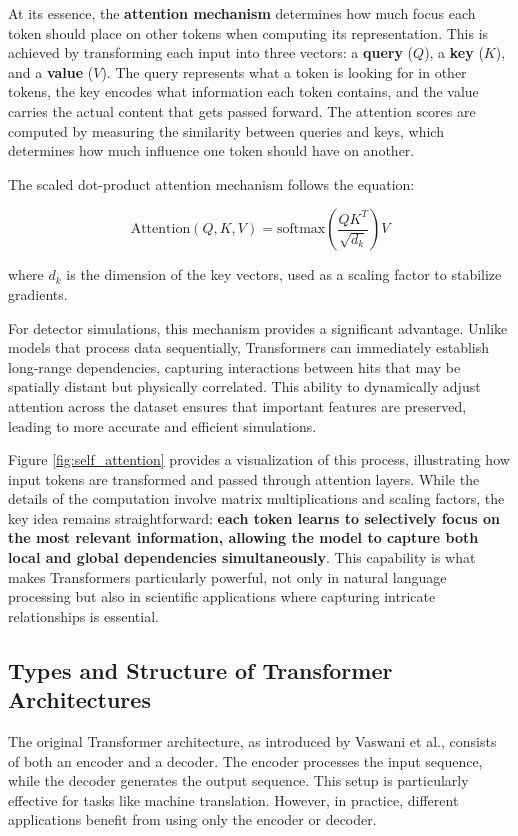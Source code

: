 At its essence, the \textbf{attention mechanism} determines how much focus each token should place on other tokens when computing its representation. This is achieved by transforming each input into three vectors: a \textbf{query} (\( Q \)), a \textbf{key} (\( K \)), and a \textbf{value} (\( V \)). The query represents what a token is looking for in other tokens, the key encodes what information each token contains, and the value carries the actual content that gets passed forward. The attention scores are computed by measuring the similarity between queries and keys, which determines how much influence one token should have on another.

The scaled dot-product attention mechanism follows the equation:

\begin{equation}
\text{Attention}(Q, K, V) = \text{softmax} \left( \frac{QK^T}{\sqrt{d_k}} \right) V
\end{equation}

where \( d_k \) is the dimension of the key vectors, used as a scaling factor to stabilize gradients.

For detector simulations, this mechanism provides a significant advantage. Unlike models that process data sequentially, Transformers can immediately establish long-range dependencies, capturing interactions between hits that may be spatially distant but physically correlated. This ability to dynamically adjust attention across the dataset ensures that important features are preserved, leading to more accurate and efficient simulations.

Figure \ref{fig:self_attention} provides a visualization of this process, illustrating how input tokens are transformed and passed through attention layers. While the details of the computation involve matrix multiplications and scaling factors, the key idea remains straightforward: \textbf{each token learns to selectively focus on the most relevant information, allowing the model to capture both local and global dependencies simultaneously}. This capability is what makes Transformers particularly powerful, not only in natural language processing but also in scientific applications where capturing intricate relationships is essential.


\subsection{Types and Structure of Transformer Architectures}
The original Transformer architecture, as introduced by Vaswani et al., consists of both an encoder and a decoder. The encoder processes the input sequence, while the decoder generates the output sequence. This setup is particularly effective for tasks like machine translation. However, in practice, different applications benefit from using only the encoder or decoder.

